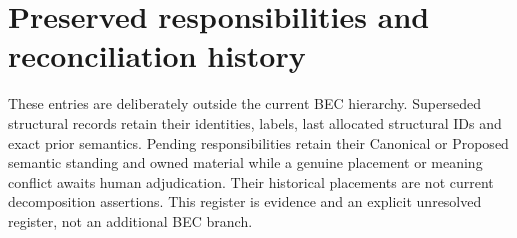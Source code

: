 \chapter{Preserved responsibilities and reconciliation history}\label{model:retained}
These entries are deliberately outside the current BEC hierarchy. Superseded structural records retain their identities, labels, last allocated structural IDs and exact prior semantics. Pending responsibilities retain their Canonical or Proposed semantic standing and owned material while a genuine placement or meaning conflict awaits human adjudication. Their historical placements are not current decomposition assertions. This register is evidence and an explicit unresolved register, not an additional BEC branch.

